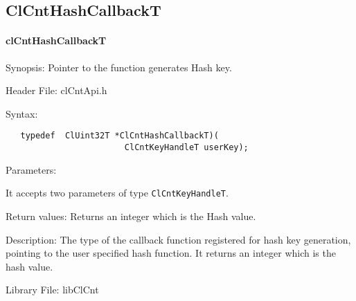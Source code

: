\newpage
\subsection{ClCntHashCallbackT}
\hypertarget{pagecnt119}{}\paragraph{cl\-Cnt\-Hash\-CallbackT}\label{pagecnt119}
\begin{Desc}
\item[Synopsis:]Pointer to the function generates Hash key.
\end{Desc}
\begin{Desc}
\item[Header File:]clCntApi.h\end{Desc}
\begin{Desc}
\item[Syntax:]

\footnotesize\begin{verbatim}   typedef  ClUint32T *ClCntHashCallbackT)(
						ClCntKeyHandleT userKey);
\end{verbatim}
\normalsize
\end{Desc}
\begin{Desc}
\item[Parameters:]
\begin{description}
It accepts two parameters of type {\tt{ClCntKeyHandleT}}.\end{description}
\end{Desc}
\begin{Desc}
\item[Return values:]
Returns an integer which is the Hash value.\end{Desc}
\begin{Desc}
\item[Description:]
The type of the callback function registered for hash key generation, pointing to the user specified hash function. It returns an integer which is the 
hash value.
\end{Desc}
\begin{Desc}
\item[Library File:]lib\-Cl\-Cnt\end{Desc}



\newpage
